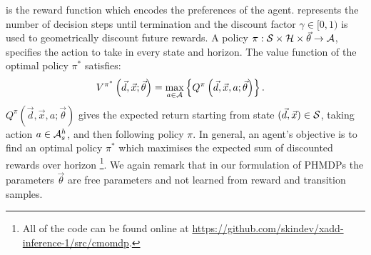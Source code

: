 {\footnotesize \RewardFunc} is the reward function which encodes the preferences of the agent. {\footnotesize \Horizon} represents the number of decision steps until termination and the discount factor {\footnotesize $\gamma \in [0, 1)$} is used to geometrically discount future rewards. A policy {\footnotesize $\pi : \mathcal{S} \times \mathcal{H} \times \vec{\theta} \rightarrow \mathcal{A}$}, specifies the action to take in every state and horizon. The value function of the optimal policy {\footnotesize$ \pi^{*} $} satisfies:
{\footnotesize 
    \abovedisplayskip=0pt
    \belowdisplayskip=0pt
    \begin{align}
        \label{eq:opt_vfunc}
        V^{\pi^{*}}\left(\vec{d}, \vec{x}; \vec{\theta}\right) &= \max_{a \in \mathcal{A}} \left\{ Q^{\pi}\left(\vec{d}, \vec{x}, a; \vec{\theta}\right) \right\}.
    \end{align}
}%
{\footnotesize $ Q^{\pi}\left(\vec{d}, \vec{x}, a; \vec{\theta}\right) $} gives the expected return starting from state {\footnotesize $(\vec{d}, \vec{x}) \in \mathcal{S}$}, taking action {\footnotesize $ a \in \mathcal{A}^{h}_{s} $}, and then following policy $ \pi $. In general, an agent's objective is to find an optimal policy {\footnotesize$ \pi^{*} $} which maximises the expected sum of discounted rewards over horizon {\footnotesize \Horizon} \footnote{All of the code can be found online at \url{https://github.com/skindev/xadd-inference-1/src/cmomdp}.}. We again remark that in our formulation of PHMDPs the parameters {\footnotesize $ \vec{\theta} $} are free parameters and not learned from reward and transition samples.

